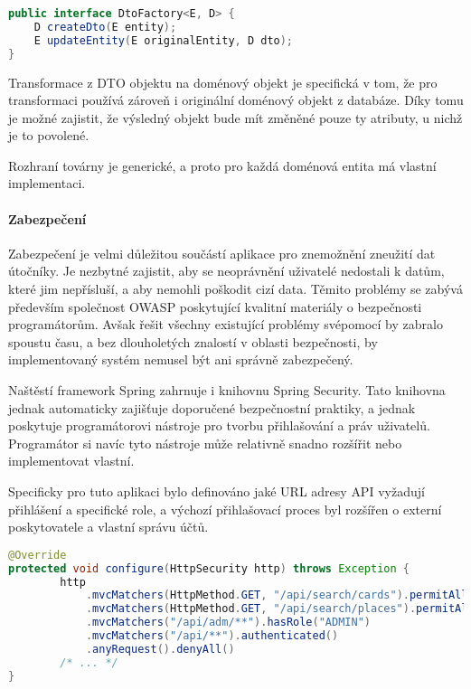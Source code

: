 			\begin{lstlisting}[language=Java, caption={Ukázka obecného rozhraní třídy pro transformaci mezi doménovými objekty a DTO objekty. Zdroj: [autor]}]
public interface DtoFactory<E, D> {
    D createDto(E entity);
    E updateEntity(E originalEntity, D dto);
}
			\end{lstlisting}

			Transformace z \ac{DTO} objektu na doménový objekt je specifická v tom, že pro transformaci používá zároveň
			i originální doménový objekt z databáze.
			Díky tomu je možné zajistit, že výsledný objekt bude mít změněné pouze ty atributy, u nichž je to povolené.

			Rozhraní továrny je generické, a proto pro každá doménová entita má vlastní implementaci.

			\paragraph{Zabezpečení}

			Zabezpečení je velmi důležitou součástí aplikace pro znemožnění zneužití dat útočníky.
			Je nezbytné zajistit, aby se neoprávnění uživatelé nedostali k datům, které jim nepřísluší, a aby nemohli
			poškodit cizí data.
			Těmito problémy se zabývá především společnost OWASP poskytující kvalitní materiály o bezpečnosti programátorům.
			Avšak řešit všechny existující problémy svépomocí by zabralo spoustu času, a bez dlouholetých znalostí v
			oblasti bezpečnosti, by implementovaný systém nemusel být ani správně zabezpečený.

			Naštěstí framework Spring zahrnuje i knihovnu Spring Security.
			Tato knihovna jednak automaticky zajišťuje doporučené bezpečnostní praktiky, a jednak poskytuje programátorovi
			nástroje pro tvorbu přihlašování a práv uživatelů.
			Programátor si navíc tyto nástroje může relativně snadno rozšířit nebo implementovat vlastní.

			Specificky pro tuto aplikaci bylo definováno jaké \ac{URL} adresy \ac{API} vyžadují přihlášení a specifické
			role, a výchozí přihlašovací proces byl rozšířen o externí poskytovatele a vlastní správu účtů.

			\begin{lstlisting}[language=Java, caption={Ukázka části nastavení zabezpečení API pomocí knihovny Spring Security. Zdroj: [autor]}]
@Override
protected void configure(HttpSecurity http) throws Exception {
        http
            .mvcMatchers(HttpMethod.GET, "/api/search/cards").permitAll()
            .mvcMatchers(HttpMethod.GET, "/api/search/places").permitAll()
            .mvcMatchers("/api/adm/**").hasRole("ADMIN")
            .mvcMatchers("/api/**").authenticated()
            .anyRequest().denyAll()
        /* ... */
}
			\end{lstlisting}

